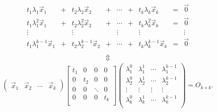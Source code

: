 \documentclass[pdf,9pt]{beamer}
\begin{document}
\begin{frame}[fragile]
    \begin{proofnoend}
    \begin{align*}
	\begin{array}{ccccccccc}
	    t_1 \lambda_1       \vec{x}_1 & + & t_2 \lambda_2   \vec{x}_2     & + & \cdots & + & t_k \lambda_k   \vec{x}_k     & = & \vec{0} \\
	    t_1 \lambda_1^2     \vec{x}_1 & + & t_2 \lambda_2^2 \vec{x}_2     & + & \cdots & + & t_k \lambda_k^2 \vec{x}_k     & = & \vec{0} \\
	    \vdots                        &   & \vdots                        &   & \vdots &   & \vdots                        &   & \vdots  \\
	    t_1 \lambda_1^{k-1} \vec{x}_1 & + & t_2 \lambda_2^{k-1} \vec{x}_2 & + & \cdots & + & t_k \lambda_k^{k-1} \vec{x}_k & = & \vec{0} \\
	\end{array}
    \end{align*}
    \[\Updownarrow\]
    \begin{align*}
	\begin{pmatrix} \vec{x}_1 & \vec{x}_2 &\cdots & \vec{x}_k \end{pmatrix}
    \begin{bmatrix}
	t_1 & 0   & 0      & 0   \\
	0   & t_2 & 0      & 0   \\
	0   & 0   & \ddots & 0   \\
	0   & 0   & 0      & t_k \\
    \end{bmatrix}
    \begin{pmatrix}
	\lambda_1^0 & \lambda_1^1 & \cdots & \lambda_{1}^{k-1} \\
	\lambda_2^0 & \lambda_2^1 & \cdots & \lambda_{2}^{k-1} \\
	\vdots      & \vdots      & \vdots & \vdots            \\
	\lambda_k^0 & \lambda_k^1 & \cdots & \lambda_{k}^{k-1} \\
    \end{pmatrix}
    = O_{k\times k}.
    \end{align*}
    \end{proofnoend}
\end{frame}
\end{document}
